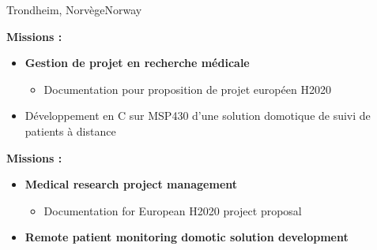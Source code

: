 {}{}{Trondheim, \ifnativelang Norv\`ege\else Norway\fi}{
\ifnativelang
	\textcolor{color1}{\textbf{Missions :}}
	\begin{itemize}[leftmargin=\ListItemsMargins]
		\ifaddmngt
		\item \textbf{Gestion de projet en recherche m\'edicale}
		\begin{itemize}
			\item Documentation pour proposition de projet europ\'een H2020
		\end{itemize}
		\fi
		\item Développement en C  sur MSP430 d’une solution domotique de suivi de patients à distance
	\end{itemize}
\else
	\textcolor{color1}{\textbf{Missions :}}
	\begin{itemize}[leftmargin=\ListItemsMargins]
		\item \textbf{Medical research project management}
		\begin{itemize}
			\item Documentation for European H2020 project proposal
		\end{itemize}
		\item \textbf{Remote patient monitoring domotic solution development}
	\end{itemize}
\fi
}


\vspace{\ItemsMaxSpacing}

